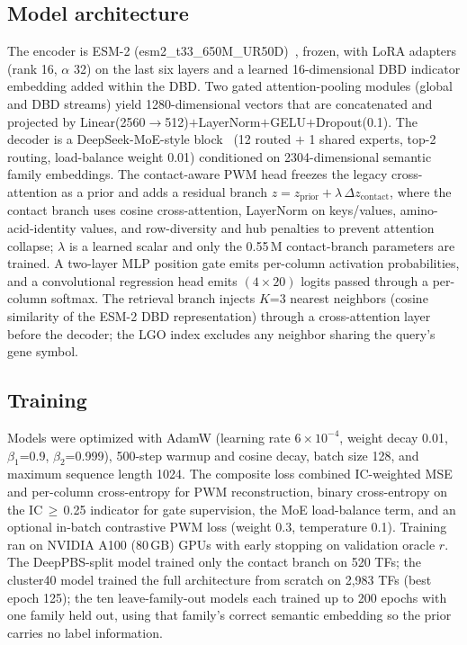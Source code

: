 \documentclass[11pt,letterpaper]{article}
\begin{document}
\subsection*{Model architecture}
The encoder is ESM-2 (esm2\_t33\_650M\_UR50D)~\cite{Lin2023}, frozen, with LoRA
adapters (rank 16, $\alpha$ 32) on the last six layers and a learned 16-dimensional
DBD indicator embedding added within the DBD. Two gated attention-pooling modules
(global and DBD streams) yield 1280-dimensional vectors that are concatenated and
projected by Linear(2560$\to$512)$+$LayerNorm$+$GELU$+$Dropout(0.1). The decoder is
a DeepSeek-MoE-style block~\cite{Dai2024} (12 routed $+$ 1 shared experts, top-2
routing, load-balance weight 0.01) conditioned on 2304-dimensional semantic family
embeddings. The contact-aware PWM head freezes the legacy cross-attention as a prior
and adds a residual branch
$z = z_{\mathrm{prior}} + \lambda\,\Delta z_{\mathrm{contact}}$, where the contact
branch uses cosine cross-attention, LayerNorm on keys/values, amino-acid-identity
values, and row-diversity and hub penalties to prevent attention collapse;
$\lambda$ is a learned scalar and only the 0.55\,M contact-branch parameters are
trained. A two-layer MLP position gate emits per-column activation probabilities,
and a convolutional regression head emits $(4\times20)$ logits passed through a
per-column softmax. The retrieval branch injects $K$=3 nearest neighbors (cosine
similarity of the ESM-2 DBD representation) through a cross-attention layer before
the decoder; the LGO index excludes any neighbor sharing the query's gene symbol.

\subsection*{Training}
Models were optimized with AdamW (learning rate $6\times10^{-4}$, weight decay 0.01,
$\beta_1$=0.9, $\beta_2$=0.999), 500-step warmup and cosine decay, batch size 128,
and maximum sequence length 1024. The composite loss combined IC-weighted MSE and
per-column cross-entropy for PWM reconstruction, binary cross-entropy on the
IC\,$\geq$\,0.25 indicator for gate supervision, the MoE load-balance term, and an
optional in-batch contrastive PWM loss (weight 0.3, temperature 0.1). Training ran
on NVIDIA A100 (80\,GB) GPUs with early stopping on validation oracle $r$. The
DeepPBS-split model trained only the contact branch on 520 TFs; the cluster40 model
trained the full architecture from scratch on 2,983 TFs (best epoch 125); the ten
leave-family-out models each trained up to 200 epochs with one family held out,
using that family's correct semantic embedding so the prior carries no label
information.
\end{document}
